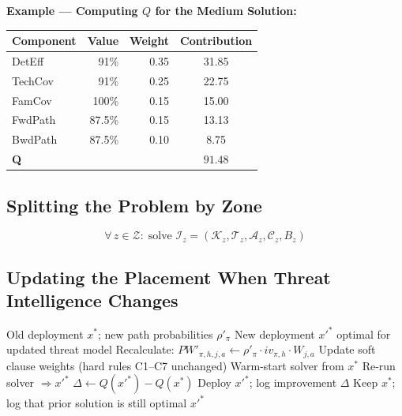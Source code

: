 \documentclass[journal]{IEEEtran}
\newcommand{\calK}{\mathcal{K}}
\newcommand{\calT}{\mathcal{T}}
\newcommand{\calA}{\mathcal{A}}
\newcommand{\calZ}{\mathcal{Z}}
\newcommand{\calC}{\mathcal{C}}
\begin{document}
\begin{examplebox}
\textbf{Example --- Computing $Q$ for the Medium Solution:}
\begin{center}
\small
\renewcommand{\arraystretch}{1.2}
\begin{tabular}{@{}lrrc@{}}
\toprule
\textbf{Component} & \textbf{Value} & \textbf{Weight} &
\textbf{Contribution} \\
\midrule
DetEff   & 91\%   & 0.35 & 31.85 \\
TechCov  & 91\%   & 0.25 & 22.75 \\
FamCov   & 100\%  & 0.15 & 15.00 \\
FwdPath  & 87.5\% & 0.15 & 13.13 \\
BwdPath  & 87.5\% & 0.10 & 8.75 \\
\midrule
\textbf{Q} & & & $\mathbf{91.48}$ \\
\bottomrule
\end{tabular}
\end{center}
\end{examplebox}

\subsection{Splitting the Problem by Zone}

\begin{equation}
  \forall\, z \in \calZ:\;
  \text{solve } \mathcal{I}_z = (\calK_z, \calT_z, \calA_z,
  \calC_z, B_z)
\end{equation}

\subsection{Updating the Placement When Threat Intelligence
            Changes}

\begin{algorithm}[htbp]
\caption{Adaptive Redeployment When Threat Priors Change}
\label{alg:redeploy}
\begin{algorithmic}[1]
\REQUIRE Old deployment $x^*$;
         new path probabilities $\rho'_\pi$
\ENSURE  New deployment $x'^*$ optimal for updated threat
         model
\STATE Recalculate:
  $PW'_{\pi,h,j,a} \leftarrow
   \rho'_\pi \cdot iv_{\pi,h} \cdot W_{j,a}$
\STATE Update soft clause weights (hard rules C1--C7
       unchanged)
\STATE Warm-start solver from $x^*$
\STATE Re-run solver $\Rightarrow x'^*$
\STATE $\Delta \leftarrow Q(x'^*) - Q(x^*)$
  \STATE Deploy $x'^*$; log improvement $\Delta$
\ELSE
  \STATE Keep $x^*$; log that prior solution is still optimal
\ENDIF
\RETURN $x'^*$
\end{algorithmic}
\end{algorithm}
\end{document}

